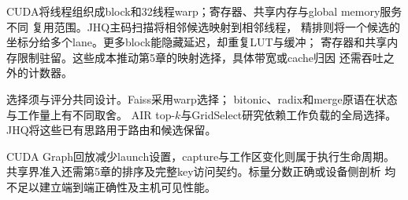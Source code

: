 CUDA将线程组织成block和32线程warp；寄存器、共享内存与global memory服务不同
复用范围\cite{cuda_programming_guide}。JHQ主码扫描将相邻候选映射到相邻线程，
精排则将一个候选的坐标分给多个lane。更多block能隐藏延迟，却重复LUT与缓冲；
寄存器和共享内存限制驻留。这些成本推动第5章的映射选择，具体带宽或cache归因
还需吞吐之外的计数器。

选择须与评分共同设计。Faiss采用warp选择\cite{johnson_gpu}；
bitonic、radix和merge原语在状态与工作量上有不同取舍。
AIR top-$k$与GridSelect研究依赖工作负载的全局选择\cite{gpu_topk}。
JHQ将这些已有思路用于路由和候选保留。

CUDA Graph回放减少launch设置，capture与工作区变化则属于执行生命周期。
共享界准入还需第5章的排序及完整key访问契约。标量分数正确或设备侧剖析
均不足以建立端到端正确性及主机可见性能。
